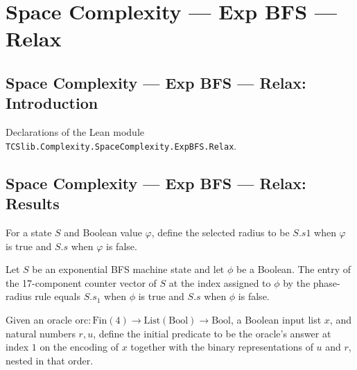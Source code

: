 \section{Space Complexity --- Exp BFS --- Relax}
\subsection*{Space Complexity --- Exp BFS --- Relax: Introduction}

Declarations of the Lean module \texttt{TCSlib.Complexity.SpaceComplexity.ExpBFS.Relax}.

\subsection*{Space Complexity --- Exp BFS --- Relax: Results}

\begin{definition}
\label{Complexity.LogProg.ExpBFS.rr}
\leanok
{}
For a state $S$ and Boolean value $\varphi$, define the selected radius to be $S.s1$
when $\varphi$ is true and $S.s$ when $\varphi$ is false.
\end{definition}

\begin{lemma}
\label{Complexity.LogProg.ExpBFS.toV_rad}
\leanok
{}
Let $S$ be an exponential BFS machine state and let $\phi$ be a Boolean. The entry of
the 17-component counter vector of $S$ at the index assigned to $\phi$ by the
phase-radius rule equals $S.s_1$ when $\phi$ is true and $S.s$ when $\phi$ is false.
\end{lemma}

\begin{definition}
\label{Complexity.LogProg.ExpBFS.ini}
\leanok
{}
Given an oracle
$\mathrm{orc}:\mathrm{Fin}(4)\to\mathrm{List}(\mathrm{Bool})\to\mathrm{Bool}$, a Boolean
input list $x$, and natural numbers $r,u$, define the initial predicate to be the
oracle's answer at index $1$ on the encoding of $x$ together with the binary
representations of $u$ and $r$, nested in that order.
\end{definition}

